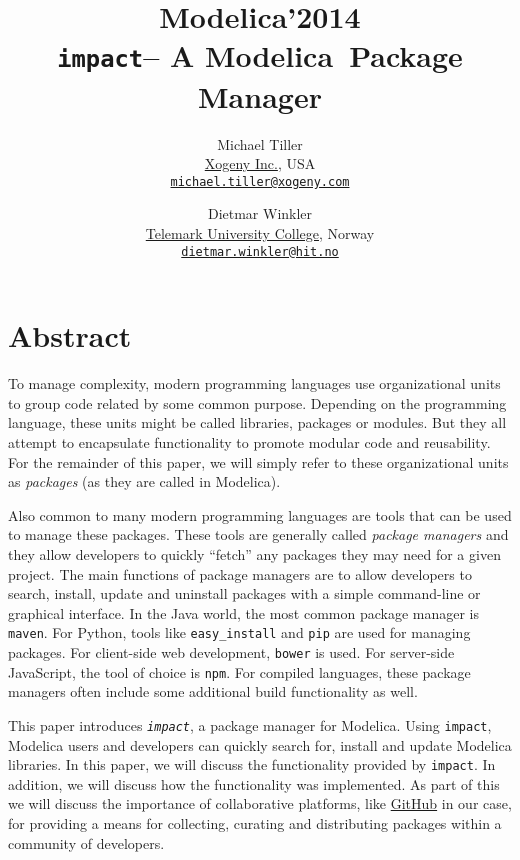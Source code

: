 \documentclass[11pt,a4paper,twocolumn]{article}
\newcommand{\myr}{\textsuperscript{\textregistered}}
\newcommand{\impact}{\texttt{impact}} %
\newcommand{\code}[1]{\texttt{#1}} %
\begin{document}
\title{\textbf{{\small Modelica'2014}\\
    \impact -- A Modelica\myr\ Package Manager}}

\author{Michael Tiller\\
  \href{http://xogeny.com}{Xogeny Inc.}, USA\\
  \href{mailto:michael.tiller@xogeny.com}{\nolinkurl{michael.tiller@xogeny.com}} %
  \and Dietmar Winkler\\
  \href{http://www.hit.no}{Telemark University College}, Norway\\
  \href{mailto:dietmar.winkler@hit.no}{\nolinkurl{dietmar.winkler@hit.no}}}
\date{} %
\maketitle\thispagestyle{empty} %

\section*{Abstract}

To manage complexity, modern programming languages use organizational
units to group code related by some common purpose.  Depending on the
programming language, these units might be called libraries, packages
or modules.  But they all attempt to encapsulate functionality to
promote modular code and reusability.  For the remainder of this
paper, we will simply refer to these organizational units as
\emph{packages} (as they are called in Modelica).

Also common to many modern programming languages are tools that can be
used to manage these packages.  These tools are generally called
\emph{package managers} and they allow developers to quickly ``fetch''
any packages they may need for a given project.  The main functions of
package managers are to allow developers to search, install, update
and uninstall packages with a simple command-line or graphical
interface.  In the Java world, the most common package manager is
\code{maven}.  For Python, tools like \code{easy\_install}\cite{easy_install}
and \code{pip}\cite{pip} are used for managing packages.  For client-side web
development, \code{bower} is used.  For server-side JavaScript, the
tool of choice is \code{npm}\cite{npm}.  For compiled languages, these package
managers often include some additional build functionality as well.

This paper introduces \emph{\impact}, a package manager for
Modelica. Using \impact, Modelica users and developers can quickly
search for, install and update Modelica libraries.  In this paper, we
will discuss the functionality provided by \impact.  In addition, we
will discuss how the functionality was implemented.  As part of this
we will discuss the importance of collaborative platforms, like
\href{https://github.com}{GitHub}\cite{github} in our case, for providing
a means for collecting, curating and distributing packages within a community
of developers.
\end{document}
